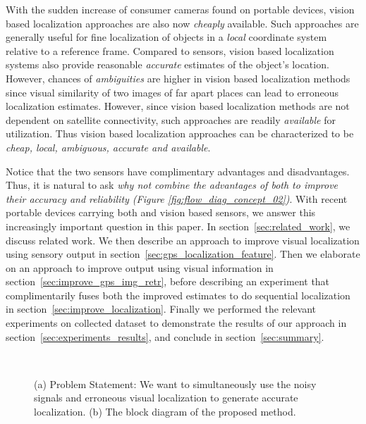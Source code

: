With the sudden increase of consumer cameras found on portable devices, vision based
localization approaches are also now \emph{cheaply} available. Such approaches are
generally useful for fine localization of objects in a \emph{local} coordinate
system relative to a reference frame. Compared to \gps sensors, vision based
localization systems also provide reasonable \emph{accurate} estimates of the
object's location. However, chances of \emph{ambiguities} are higher
in vision based localization methods since visual similarity of two
images of far apart places can lead to erroneous localization estimates. However,
since vision based localization methods are not dependent on satellite 
connectivity, such approaches are readily \emph{available} for utilization. Thus
vision based localization approaches can be characterized to be \emph{cheap, local,
ambiguous, accurate and available}. 

Notice that the two sensors have
complimentary advantages and disadvantages.
Thus, it is natural to ask {\em why not combine the advantages of both to 
improve their accuracy and reliability (Figure \ref{fig:flow_diag_concept_02})}. 
With recent portable devices carrying both \gps and vision based sensors, we
answer this increasingly important question in this paper.
In section~\ref{sec:related_work}, we discuss related work. We then describe
an approach to improve visual localization using \gps sensory output in
section~\ref{sec:gps_localization_feature}. Then we elaborate on an approach to 
improve \gps output using visual information in section~\ref{sec:improve_gps_img_retr}, before
describing an experiment that complimentarily fuses both the improved
estimates to do sequential localization in section~\ref{sec:improve_localization}.
Finally we performed the relevant experiments on collected dataset to demonstrate
the results of our approach in section~\ref{sec:experiments_results}, 
and conclude in section~\ref{sec:summary}.

\begin{figure}[t]
\centering
 \\
\caption{
(a) Problem Statement: We want to simultaneously use the 
noisy \gps signals and erroneous visual localization to 
generate accurate localization. (b) The block diagram of the proposed method.} 
\end{figure}

